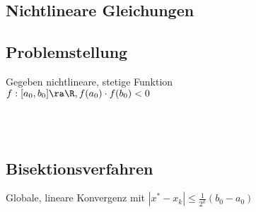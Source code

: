 \documentclass[fs, footer]{latex4ei}
\begin{document}
\begin{sectionbox}
\begin{sectionbox}







\section{Nichtlineare Gleichungen}
\begin{sectionbox}
	\subsection*{Problemstellung}
	Gegeben nichtlineare, stetige Funktion \\ 
	$f: [a_0, b_0] \ra \R, f(a_0)\cdot f(b_0) < 0$
\end{sectionbox} \\ \\

\begin{sectionbox}
	\subsection{Bisektionsverfahren}
	Globale, lineare Konvergenz mit $|x^* - x_k| \le \frac{1}{2^k} (b_0 -a_0)$\\
\end{sectionbox}

\begin{sectionbox}

\end{sectionbox}
\end{sectionbox}
\end{sectionbox}
\end{document}
